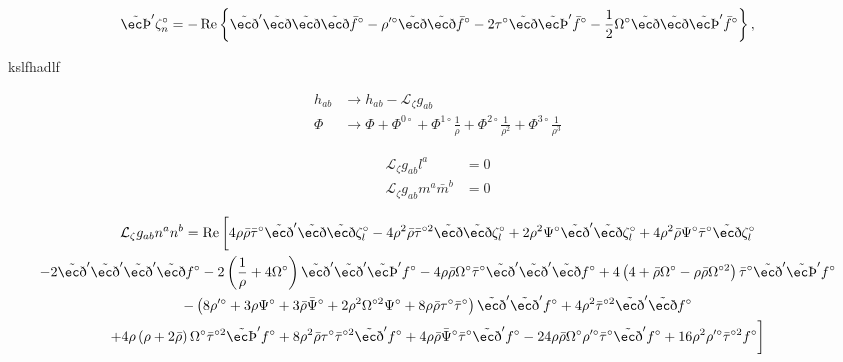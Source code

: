\begin{equation}
\tilde{\thorn}' \zeta^\circ_n = - \Re \left\{ \tilde{\eth}' \tilde{\eth} \tilde{\eth} \tilde{\eth} \bar{f}^\circ - \rho^{\prime \circ} \tilde{\eth} \tilde{\eth} \bar{f}^\circ - 2 \tau^\circ \tilde{\eth} \tilde{\thorn}' \bar{f}^\circ - \frac{1}{2} \Omega^\circ \tilde{\eth} \tilde{\eth} \tilde{\thorn}' \bar{f}^\circ \right\},
\end{equation}

kslfhadlf

\begin{equation}
\begin{split}
h_{ab} & \to h_{ab} - \mathcal{L}_\zeta g_{ab}\\
\Phi & \to \Phi + \Phi^{0 \circ} + \Phi^{1 \circ} \frac{1}{\rho} + \Phi^{2 \circ} \frac{1}{\rho^2} + \Phi^{3 \circ} \frac{1}{\rho^3}
\end{split}
\end{equation}

\begin{equation}
\begin{split}
\mathcal{L}_\zeta g_{ab} l^a & = 0\\
\mathcal{L}_\zeta g_{ab} m^a \bar{m}^b & = 0
\end{split}
\end{equation}

\begin{multline}
\mathcal{L}_\zeta g_{ab} n^a n^b = \Re \bigg[ 4 \rho \bar{\rho} \bar{\tau}^\circ \tilde{\eth}' \tilde{\eth} \tilde{\eth} \zeta^\circ_l - 4 \rho^2 \bar{\rho} \bar{\tau}^{\circ 2} \tilde{\eth} \tilde{\eth} \zeta^\circ_l + 2 \rho^2 \Psi^\circ \tilde{\eth}' \tilde{\eth} \zeta^\circ_l + 4 \rho^2 \bar{\rho} \Psi^\circ \bar{\tau}^\circ \tilde{\eth} \zeta^\circ_l\\
- 2 \tilde{\eth}' \tilde{\eth}' \tilde{\eth}' \tilde{\eth} f^\circ - 2\left( \frac{1}{\rho} + 4 \Omega^\circ \right) \tilde{\eth}' \tilde{\eth}' \tilde{\thorn}' f^\circ - 4 \rho \bar{\rho} \Omega^\circ \bar{\tau}^\circ \tilde{\eth}' \tilde{\eth}' \tilde{\eth} f^\circ + 4 \left( 4 + \bar{\rho} \Omega^\circ - \rho \bar{\rho} \Omega^{\circ 2} \right) \bar{\tau}^\circ \tilde{\eth}' \tilde{\thorn}' f^\circ\\
- \left( 8 \rho^{\prime \circ} + 3 \rho \Psi^\circ + 3 \bar{\rho} \bar{\Psi}^\circ + 2 \rho^2 \Omega^{\circ 2} \Psi^\circ + 8 \rho \bar{\rho} \tau^\circ \bar{\tau}^\circ \right) \tilde{\eth}' \tilde{\eth}' f^\circ + 4 \rho^2 \bar{\tau}^{\circ 2} \tilde{\eth}' \tilde{\eth} f^\circ\\
+ 4 \rho \left( \rho + 2 \bar{\rho} \right) \Omega^\circ \bar{\tau}^{\circ 2} \tilde{\thorn}' f^\circ + 8 \rho^2 \bar{\rho} \tau^\circ \bar{\tau}^{\circ 2} \tilde{\eth}' f^\circ + 4 \rho \bar{\rho} \bar{\Psi}^\circ \bar{\tau}^\circ \tilde{\eth}' f^\circ - 24 \rho \bar{\rho} \Omega^\circ \rho^{\prime \circ} \bar{\tau}^\circ \tilde{\eth}' f^\circ + 16 \rho^2 \rho^{\prime \circ} \bar{\tau}^{\circ 2} f^\circ \bigg]
\end{multline}

